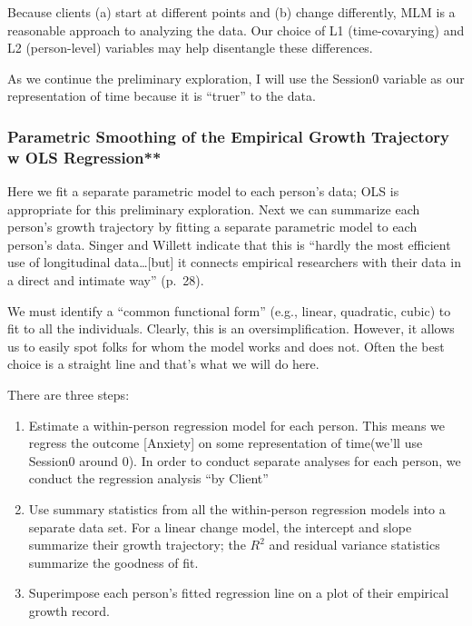 \documentclass[
  english,
]{book}
\providecommand{\tightlist}{%
  \setlength{\itemsep}{0pt}\setlength{\parskip}{0pt}}
\begin{document}
Because clients (a) start at different points and (b) change differently, MLM is a reasonable approach to analyzing the data. Our choice of L1 (time-covarying) and L2 (person-level) variables may help disentangle these differences.

As we continue the preliminary exploration, I will use the Session0 variable as our representation of time because it is ``truer'' to the data.

\hypertarget{parametric-smoothing-of-the-empirical-growth-trajectory-w-ols-regression}{%
\subsubsection{Parametric Smoothing of the Empirical Growth Trajectory w OLS Regression**}\label{parametric-smoothing-of-the-empirical-growth-trajectory-w-ols-regression}}

Here we fit a separate parametric model to each person's data; OLS is appropriate for this preliminary exploration. Next we can summarize each person's growth trajectory by fitting a separate parametric model to each person's data. Singer and Willett \citeyearpar{singer_applied_2003} indicate that this is ``hardly the most efficient use of longitudinal data\ldots{[}but{]} it connects empirical researchers with their data in a direct and intimate way'' (p.~28).

We must identify a ``common functional form'' (e.g., linear, quadratic, cubic) to fit to all the individuals. Clearly, this is an oversimplification. However, it allows us to easily spot folks for whom the model works and does not. Often the best choice is a straight line and that's what we will do here.

There are three steps:

\begin{enumerate}
\def\labelenumi{\arabic{enumi}.}
\tightlist
\item
  Estimate a within-person regression model for each person. This means we regress the outcome {[}Anxiety{]} on some representation of time(we'll use Session0 around 0). In order to conduct separate analyses for each person, we conduct the regression analysis ``by Client''
\item
  Use summary statistics from all the within-person regression models into a separate data set. For a linear change model, the intercept and slope summarize their growth trajectory; the \(R^2\) and residual variance statistics summarize the goodness of fit.
\item
  Superimpose each person's fitted regression line on a plot of their empirical growth record.
\end{enumerate}
\end{document}
